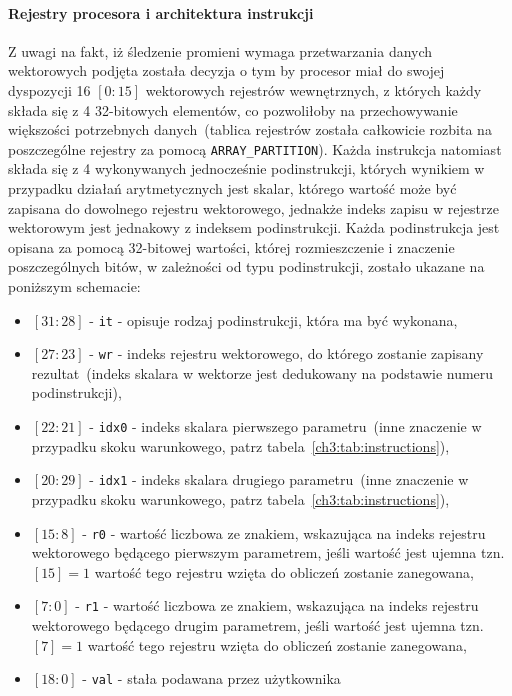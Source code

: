\paragraph{Rejestry procesora i architektura instrukcji}
Z uwagi na fakt, iż śledzenie promieni wymaga przetwarzania danych wektorowych podjęta została decyzja o tym by procesor miał do swojej dyspozycji 16 $[0:15]$ wektorowych rejestrów wewnętrznych, z których każdy składa się z 4 32-bitowych elementów, co pozwoliłoby na przechowywanie większości potrzebnych danych~(tablica rejestrów została całkowicie rozbita na poszczególne rejestry za pomocą \texttt{ARRAY\_PARTITION}). Każda instrukcja natomiast składa się z 4 wykonywanych jednocześnie podinstrukcji, których wynikiem w przypadku działań arytmetycznych jest skalar, którego wartość może być zapisana  do dowolnego rejestru wektorowego, jednakże indeks zapisu w rejestrze wektorowym jest jednakowy z indeksem podinstrukcji. Każda podinstrukcja jest opisana za pomocą 32-bitowej wartości, której rozmieszczenie i znaczenie poszczególnych bitów, w zależności od typu podinstrukcji, zostało ukazane na poniższym schemacie:
\begin{itemize}
\item[] $[31:28]$ - \texttt{it} - opisuje rodzaj podinstrukcji, która ma być wykonana,
\item[] $[27:23]$ - \texttt{wr} - indeks rejestru wektorowego, do którego zostanie zapisany rezultat~(indeks skalara w wektorze jest dedukowany na podstawie numeru podinstrukcji),
\item[] $[22:21]$ - \texttt{idx0} - indeks skalara pierwszego parametru~(inne znaczenie w przypadku skoku warunkowego, patrz tabela~\ref{ch3:tab:instructions}),
\item[] $[20:29]$ - \texttt{idx1} - indeks skalara drugiego parametru~(inne znaczenie w przypadku skoku warunkowego, patrz tabela~\ref{ch3:tab:instructions}),
\item[] $[15:8]$ - \texttt{r0} - wartość liczbowa ze znakiem, wskazująca na indeks rejestru wektorowego będącego pierwszym parametrem, jeśli wartość jest ujemna tzn.~$[15]=1$ wartość tego rejestru wzięta do obliczeń zostanie zanegowana,
\item[] $[7:0]$ - \texttt{r1} - wartość liczbowa ze znakiem, wskazująca na indeks rejestru wektorowego będącego drugim parametrem, jeśli wartość jest ujemna tzn. $[7]=1$ wartość tego rejestru wzięta do obliczeń zostanie zanegowana,
\item[] $[18:0]$ - \texttt{val} - stała podawana przez użytkownika
\end{itemize}
